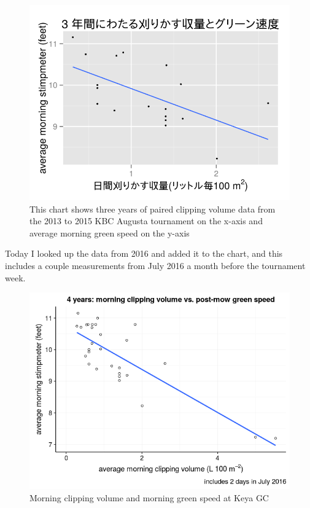 \documentclass[12pt,b5,]{tufte-book}
\begin{document}
\begin{figure}
\centering
\includegraphics{img/b10-1.png}
\caption{This chart shows three years of paired clipping volume data from the 2013 to 2015 KBC Augusta tournament on the x-axis and average morning green speed on the y-axis}
\end{figure}

Today I looked up the data from 2016 and added it to the chart, and this includes a couple measurements from July 2016 a month before the tournament week.

\begin{figure}
\centering
\includegraphics{img/b10-2.png}
\caption{Morning clipping volume and morning green speed at Keya GC}
\end{figure}
\end{document}
